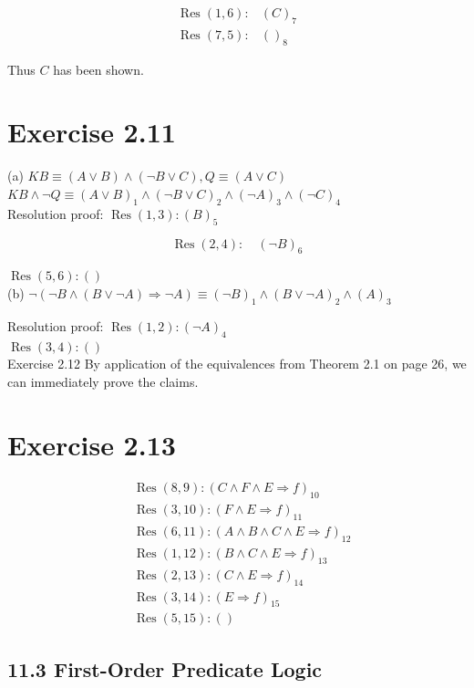 \documentclass[10pt]{article}
\begin{document}
$$
\begin{array}{ll}
\operatorname{Res}(1,6): & (C)_{7} \\
\operatorname{Res}(7,5): & ()_{8}
\end{array}
$$

Thus $C$ has been shown.

\section*{Exercise 2.11}
(a) $K B \equiv(A \vee B) \wedge(\neg B \vee C), Q \equiv(A \vee C)$\\
$K B \wedge \neg Q \equiv(A \vee B)_{1} \wedge(\neg B \vee C)_{2} \wedge(\neg A)_{3} \wedge(\neg C)_{4}$\\
Resolution proof: $\operatorname{Res}(1,3):(B)_{5}$

$$
\operatorname{Res}(2,4): \quad(\neg B)_{6}
$$

$\operatorname{Res}(5,6):()$\\
(b) $\neg(\neg B \wedge(B \vee \neg A) \Rightarrow \neg A) \equiv(\neg B)_{1} \wedge(B \vee \neg A)_{2} \wedge(A)_{3}$

Resolution proof: $\operatorname{Res}(1,2):(\neg A)_{4}$\\
$\operatorname{Res}(3,4):()$\\
Exercise 2.12 By application of the equivalences from Theorem 2.1 on page 26, we can immediately prove the claims.

\section*{Exercise 2.13}
$$
\begin{aligned}
& \operatorname{Res}(8,9):(C \wedge F \wedge E \Rightarrow f)_{10} \\
& \operatorname{Res}(3,10):(F \wedge E \Rightarrow f)_{11} \\
& \operatorname{Res}(6,11):(A \wedge B \wedge C \wedge E \Rightarrow f)_{12} \\
& \operatorname{Res}(1,12):(B \wedge C \wedge E \Rightarrow f)_{13} \\
& \operatorname{Res}(2,13):(C \wedge E \Rightarrow f)_{14} \\
& \operatorname{Res}(3,14):(E \Rightarrow f)_{15} \\
& \operatorname{Res}(5,15):()
\end{aligned}
$$

\subsection*{11.3 First-Order Predicate Logic}
\end{document}
